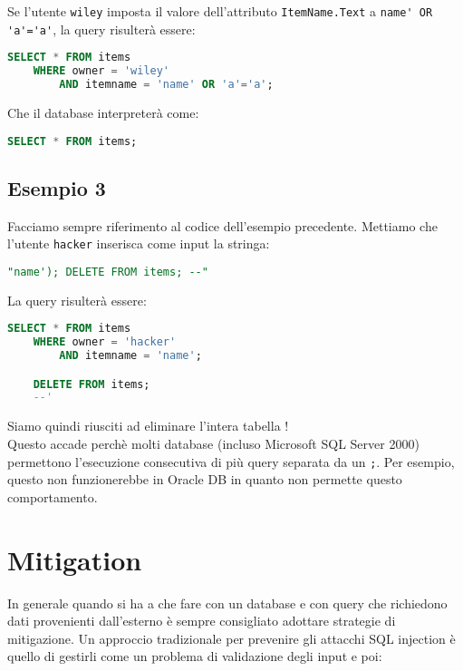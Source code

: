 Se l'utente \verb|wiley| imposta il valore dell'attributo \verb|ItemName.Text|
a \verb|name' OR 'a'='a'|, la query risulterà essere:

\begin{lstlisting}[language=SQL]
    SELECT * FROM items
    WHERE owner = 'wiley'
        AND itemname = 'name' OR 'a'='a';
\end{lstlisting}

Che il database interpreterà come:

\begin{lstlisting}[language=SQL]
    SELECT * FROM items;
\end{lstlisting}

\subsection{Esempio 3}

Facciamo sempre riferimento al codice dell'esempio precedente.
Mettiamo che l'utente \verb|hacker| inserisca come input la stringa:

\begin{lstlisting}[language=SQL]
    "name'); DELETE FROM items; --"
\end{lstlisting}

La query risulterà essere:

\begin{lstlisting}[language=SQL]
    SELECT * FROM items
    WHERE owner = 'hacker'
        AND itemname = 'name';

    DELETE FROM items;
    --'
\end{lstlisting}

Siamo quindi riusciti ad eliminare l'intera tabella !\\
Questo accade perchè molti database (incluso Microsoft SQL Server 2000)
permettono l'esecuzione consecutiva di più query separata da un \verb|;|.
Per esempio, questo non funzionerebbe in Oracle DB in quanto non permette questo
comportamento.

\section{Mitigation}

In generale quando si ha a che fare con un database e con query che richiedono dati
provenienti dall'esterno è sempre consigliato adottare strategie di mitigazione.
Un approccio tradizionale per prevenire gli attacchi SQL injection è quello di
gestirli come un
problema di validazione degli input e poi:

